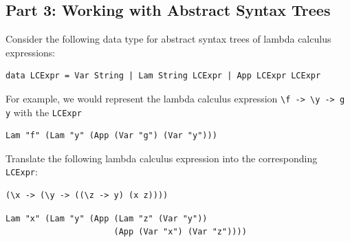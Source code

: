\documentclass[addpoints]{exam}
\begin{document}
\begin{questions}

\subsection*{\textbf{Part 3: Working with Abstract Syntax Trees}}

\noindent Consider the following data type for abstract syntax trees of lambda calculus expressions:

\begin{verbatim}
data LCExpr = Var String | Lam String LCExpr | App LCExpr LCExpr
\end{verbatim}

For example, we would represent the lambda calculus expression \verb|\f -> \y -> g y| with the \texttt{LCExpr}
\begin{verbatim}
Lam "f" (Lam "y" (App (Var "g") (Var "y")))
\end{verbatim}

\question[5] Translate the following lambda calculus expression into the corresponding \texttt{LCExpr}:

\begin{verbatim}
(\x -> (\y -> ((\z -> y) (x z))))
\end{verbatim}
\begin{solutionorbox}[1.5in]
\begin{verbatim}
Lam "x" (Lam "y" (App (Lam "z" (Var "y"))
                      (App (Var "x") (Var "z"))))
\end{verbatim}
\end{solutionorbox}


\end{questions}
\end{document}
